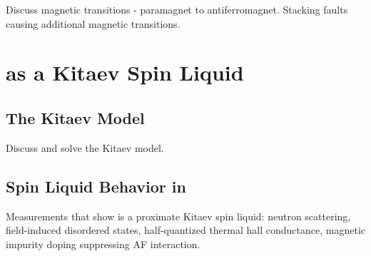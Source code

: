 Discuss magnetic transitions - paramagnet to antiferromagnet. Stacking faults causing additional magnetic transitions.

\section{\texorpdfstring{\rucl}{RuCl3} as a Kitaev Spin Liquid}

\subsection{The Kitaev Model}

Discuss and solve the Kitaev model.

\subsection{Spin Liquid Behavior in \texorpdfstring{\rucl}{RuCl3}}

Measurements that show \rucl is a proximate Kitaev spin liquid: neutron scattering, field-induced disordered states, half-quantized thermal hall conductance, magnetic impurity doping suppressing AF interaction.